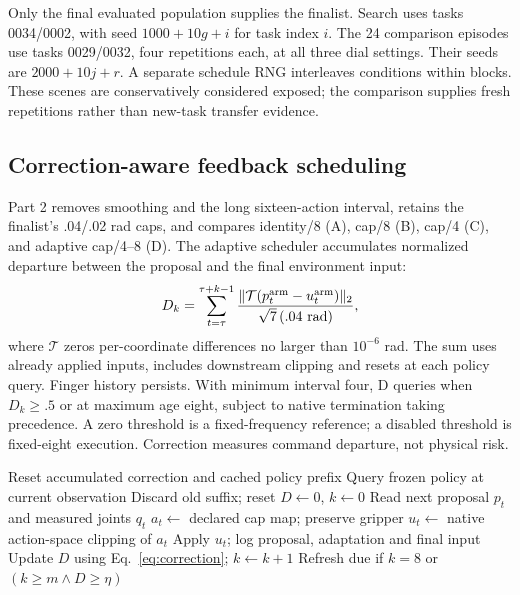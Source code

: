 \documentclass[sigconf,dvipsnames]{acmart}
\begin{document}
Only the final evaluated population supplies the finalist. Search uses tasks
0034/0002, with seed $1000+10g+i$ for task index $i$. The 24 comparison episodes
use tasks 0029/0032, four repetitions each, at all three dial settings. Their seeds
are $2000+10j+r$. A separate schedule RNG interleaves conditions within blocks.
These scenes are conservatively considered exposed; the comparison supplies fresh
repetitions rather than new-task transfer evidence.

\subsection{Correction-aware feedback scheduling}
Part 2 removes smoothing and the long sixteen-action interval, retains the finalist's
.04/.02 rad caps, and compares identity/8 (A), cap/8 (B), cap/4 (C), and adaptive
cap/4--8 (D). The adaptive scheduler accumulates normalized departure between
the proposal and the final environment input:
\begin{equation}
 D_k=\sum_{t=\tau}^{\tau+k-1}
 \frac{\|\mathcal T(p_t^{\rm arm}-u_t^{\rm arm})\|_2}{\sqrt7\,(.04\ \mathrm{rad})},
 \label{eq:correction}
\end{equation}
where $\mathcal T$ zeros per-coordinate differences no larger than $10^{-6}$ rad.
The sum uses already applied inputs, includes downstream clipping and resets at
each policy query. Finger history persists. With minimum interval four, D queries
when $D_k\ge.5$ or at maximum age eight, subject to native termination taking
precedence. A zero threshold is a fixed-frequency reference; a disabled threshold
is fixed-eight execution. Correction measures command departure, not physical risk.

\begin{algorithm}[t]
\caption{Causal correction-aware execution interface}
\label{alg:feedback}
\begin{algorithmic}[1]
\State Reset accumulated correction and cached policy prefix
    \State Query frozen policy at current observation
    \State Discard old suffix; reset $D\gets0$, $k\gets0$
  \EndIf
  \State Read next proposal $p_t$ and measured joints $q_t$
  \State $a_t\gets$ declared cap map; preserve gripper
  \State $u_t\gets$ native action-space clipping of $a_t$
  \State Apply $u_t$; log proposal, adaptation and final input
  \State Update $D$ using Eq.~\eqref{eq:correction}; $k\gets k+1$
  \State Refresh due if $k=8$ or $(k\ge m\land D\ge\eta)$
\EndWhile
\end{algorithmic}
\end{algorithm}
\end{document}
